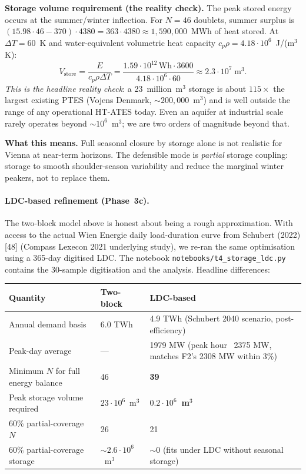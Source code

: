 \documentclass{article}
\begin{document}
\textbf{Storage volume requirement (the reality check).} The
peak stored energy occurs at the summer/winter inflection. For
$N=46$ doublets, summer surplus is
$(15.98 \cdot 46 - 370) \cdot 4380 = 363 \cdot 4380 \approx
1{,}590{,}000$~MWh of heat stored. At $\Delta T = 60$~K and
water-equivalent volumetric heat capacity $c_p \rho = 4.18 \cdot
10^6$~J/(m$^3$\,K):
\[
V_{\mathrm{store}} = \frac{E}{c_p\rho \Delta T}
                   = \frac{1.59 \cdot 10^{12}\,\mathrm{Wh} \cdot 3600}
                          {4.18 \cdot 10^6 \cdot 60}
                   \approx 2.3 \cdot 10^7\;\mathrm{m^3}.
\]
\emph{This is the headline reality check}: a 23~million~m$^3$
storage is about $115\times$ the largest existing PTES (Vojens
Denmark, $\sim 200{,}000$~m$^3$) and is well outside the range of
any operational HT-ATES today. Even an aquifer at industrial
scale rarely operates beyond $\sim 10^6$~m$^3$; we are
two orders of magnitude beyond that.

\textbf{What this means.} Full seasonal closure by storage alone
is not realistic for Vienna at near-term horizons. The defensible
mode is \emph{partial} storage coupling: storage to smooth
shoulder-season variability and reduce the marginal winter
peakers, not to replace them.

\paragraph{LDC-based refinement (Phase~3c).} The two-block model
above is honest about being a rough approximation. With access to
the actual Wien Energie daily load-duration curve from
Schubert (2022) [48] (Compass Lexecon 2021 underlying study), we
re-ran the same optimisation using a 365-day digitised LDC. The
notebook \texttt{notebooks/t4\_storage\_ldc.py} contains the
30-sample digitisation and the analysis. Headline differences:

\begin{center}
\begin{tabular}{lll}
\hline
\textbf{Quantity} & \textbf{Two-block} & \textbf{LDC-based} \\
\hline
Annual demand basis                  & 6.0 TWh & 4.9 TWh (Schubert 2040 scenario, post-efficiency) \\
Peak-day average                     & --- & 1979 MW (peak hour ~2375 MW, matches F2's 2308 MW within 3\%) \\
Minimum $N$ for full energy balance  & 46     & \textbf{39} \\
Peak storage volume required         & $23\cdot 10^{6}$~m$^3$ & \textbf{$0.2\cdot 10^{6}$~m$^3$} \\
60\% partial-coverage $N$            & 26     & 21 \\
60\% partial-coverage storage        & $\sim 2.6\cdot 10^{6}$~m$^3$ & $\sim 0$ (fits under LDC without seasonal storage) \\
\hline
\end{tabular}
\end{center}
\end{document}
